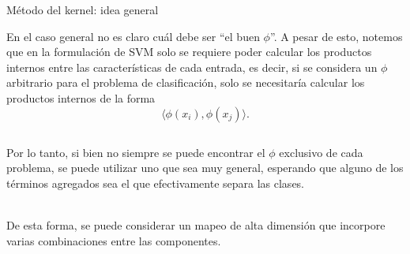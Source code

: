 \documentclass[9pt, handout]{beamer}
\begin{document}
\begin{frame}{Método del kernel: idea general}

En el caso general no es claro cuál debe ser ``el buen $\phi$''. A pesar de esto, notemos que en la formulación de SVM solo se requiere poder calcular los productos internos entre las características de cada entrada, es decir, si se considera un $\phi$ arbitrario para el problema de clasificación, solo se necesitaría calcular los productos internos de la forma
\begin{equation*}
    \langle \phi(x_i) , \phi(x_j) \rangle.
\end{equation*}
 \pause

\begin{columns}


\begin{column}{0.5\textwidth}
	Por lo tanto, si bien no siempre se puede encontrar el $\phi$ exclusivo de cada problema, se puede utilizar uno que sea muy general, esperando que alguno de los términos agregados sea el que efectivamente separa las clases.\\~\ \pause

De esta forma, se puede considerar un mapeo de alta dimensión que incorpore varias combinaciones entre las componentes.

\end{column}
	

\end{columns}
\end{frame}
\end{document}
